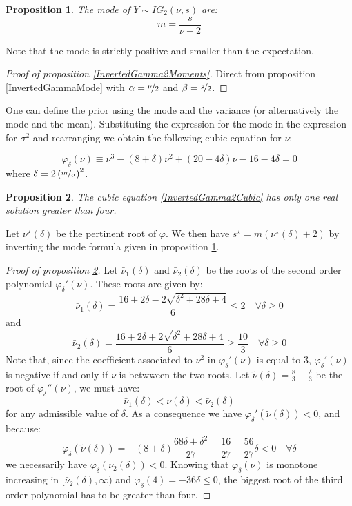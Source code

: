 \documentclass{amsart}
\theoremstyle{plain}
\newtheorem{proposition}{Proposition}[section]
\theoremstyle{remark}
\numberwithin{equation}{section}
\begin{document}
\begin{proposition}\label{InvertedGamma2Mode}
  The mode of $Y\sim IG_2(\nu, s)$ are:
  \[
    m = \frac{s}{\nu+2}
  \]
\end{proposition}

Note that the mode is strictly positive and smaller than the expectation.

\begin{proof}[Proof of proposition \ref{InvertedGamma2Moments}]
  Direct from proposition \ref{InvertedGammaMode} with $\alpha=\nicefrac{\nu}{2}$ and $\beta=\nicefrac{s}{2}$.
\end{proof}

One can define the prior using the mode and the variance (or alternatively the
mode and the mean). Substituting the expression for the mode in the expression
for $\sigma^2$ and rearranging we obtain the following cubic equation for $\nu$:

\begin{equation}\label{InvertedGamma2Cubic}
\varphi_{\delta}(\nu) \equiv \nu^3 - (8+\delta)\nu^2 + (20-4\delta)\nu - 16 -4\delta = 0
\end{equation}
where $\delta = 2\left(\nicefrac{m}{\sigma}\right)^2$.

\begin{proposition}\label{InvertedGamma2SolveCubic}
  The cubic equation \eqref{InvertedGamma2Cubic} has only one real solution greater than four.
\end{proposition}

Let $\nu^{\star}(\delta)$ be the pertinent root of $\varphi$. We then have $s^{\star} = m(\nu^{\star}(\delta)+2)$ by inverting
the mode formula given in proposition \ref{InvertedGamma2Mode}.

\begin{proof}[Proof of proposition \ref{InvertedGamma2SolveCubic}]
  Let $\bar\nu_1(\delta)$ and $\bar\nu_2(\delta)$ be the roots of the
  second order polynomial $\varphi_{\delta}'(\nu)$. These roots are
  given by:
  \[
    \bar\nu_1(\delta) = \frac{16+2\delta-2\sqrt{\delta^2+28\delta+4}}{6}\leq 2 \quad \forall \delta\geq 0
  \]
  and
  \[
    \bar\nu_2(\delta) = \frac{16+2\delta+2\sqrt{\delta^2+28\delta+4}}{6}\geq \frac{10}{3} \quad \forall \delta\geq 0
  \]
  Note that, since the coefficient associated to $\nu^2$ in
  $\varphi_{\delta}'(\nu)$ is equal to 3, $\varphi_{\delta}'(\nu)$ is
  negative if and only if $\nu$ is betwween the two roots.  Let
  $\tilde\nu(\delta) = \frac{8}{3}+\frac{\delta}{3}$ be the root of
  $\varphi_{\delta}''(\nu)$, we must have:
  \[
    \bar\nu_1(\delta) < \tilde\nu(\delta) < \bar\nu_2(\delta)
  \]
  for any admissible value of $\delta$. As a consequence we have $\varphi_{\delta}'(\tilde\nu(\delta))<0$, and because:
  \[
    \varphi_{\delta}(\tilde\nu(\delta)) = -(8+\delta)\frac{68\delta+\delta^2}{27}-\frac{16}{27}-\frac{56}{27}\delta <0 \quad \forall \delta
  \]
  we necessarily have $\varphi_{\delta}(\bar\nu_2(\delta))<0$. Knowing
  that $\varphi_{\delta}(\nu)$ is monotone increasing in
  $[\bar\nu_2(\delta), \infty)$ and
  $\varphi_{\delta}(4) = -36\delta \leq 0$, the biggest root of the
  third order polynomial has to be greater than four.
\end{proof}
\end{document}
